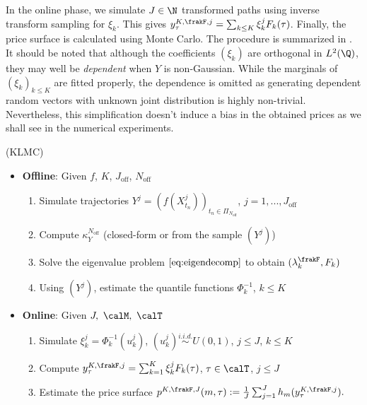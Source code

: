 In the online phase, we simulate $J \in \N$ transformed paths using inverse transform sampling for $\xi_k$. This gives $y_{\tau}^{K,\frakF,j}= \sum_{k\le K}\xi_k^{j} F_k(\tau)$.  
Finally, the price surface is calculated using Monte Carlo.  The procedure is summarized in . 
It should be noted that although the coefficients $(\xi_k)$ are orthogonal in $L^2(\Q)$, they may well be \textit{dependent} when $Y$ is non-Gaussian. While the marginals of $(\xi_k)_{k\le K}$ are fitted properly, 
the dependence is omitted as generating dependent random vectors with unknown joint distribution is highly non-trivial. Nevertheless, this simplification doesn't induce a bias in the obtained prices as we shall see in the numerical experiments.  


\begin{algorithm}[t]
\caption{(KLMC) }\label{alg:klmc}
\begin{itemize}
\vspace{-2mm}
\item \textbf{Offline}: Given $f$, $K$,  $J_{\text{off}}$, $N_{\text{off}}$ 
\begin{enumerate}
\setlength \itemsep{0.2ex}
\vspace{-2mm}
\item Simulate trajectories $Y^j=(f(X_{t_n}^j))_{t_n \in \Pi_{N_{\text{off}}}}$, $j=1,...,J_{\text{off}}$
\item Compute $\kappa^{N_{\text{off}}}_Y$ (closed-form or from the sample  $(Y^j)$)
\item Solve the eigenvalue problem $\eqref{eq:eigendecomp}$ to obtain  $(\lambda^{\frakF}_k,F_k)$
\item Using $(Y^j)$, estimate the quantile functions  $\Phi_k^{-1}$, $k\le K$ 
\end{enumerate}
\vspace{-2mm}

\item \textbf{Online}: Given $J, \ \calM, \ \calT$ 
\begin{enumerate}
\setlength \itemsep{0.2ex}
\vspace{-2mm}
\item Simulate $\xi^j_k = \Phi^{-1}_k(u_k^j)$, $(u_k^j) \overset{i.i.d.}{\sim} U(0,1)$, $j \le J$, $k\le K$
\item Compute $y_\tau^{K,\frakF,j} =\sum_{k=1}^K  \xi^j_k    F_k(\tau)$, $\tau \in \calT$, $j\le J$ 
\item Estimate the price surface $p^{K,\frakF,J}(m,\tau) := \frac{1}{J}\sum_{j=1}^{J} h_m(y_\tau^{K,\frakF,j}).$
\end{enumerate}
\end{itemize}
\vspace{-3mm}
\end{algorithm}

